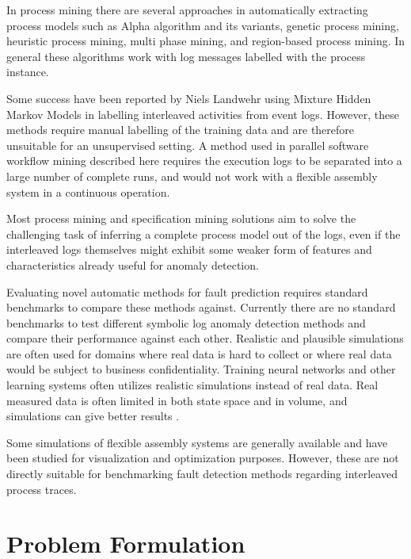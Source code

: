 \documentclass[procedia]{easychair}
\begin{document}
In process mining there are several approaches in automatically extracting process models such as Alpha algorithm and its 
variants, genetic process mining, heuristic process mining, multi phase mining, and region-based process mining. In general these algorithms work with log messages labelled with the process instance.

Some success have been reported by Niels Landwehr using Mixture Hidden Markov Models \cite{landwehr2008modeling} in labelling interleaved activities from event logs.
However, these methods require manual labelling of the training data and are therefore unsuitable for an unsupervised setting.
A method used in parallel software workflow mining described here \cite{mining-program-workflow-from-interleaved-traces} requires the execution logs to be separated into
a large number of complete runs, and would not work with a flexible assembly system in a continuous operation.

Most process mining and specification mining
solutions aim to solve the challenging task of inferring a complete process model out of the logs, even if the interleaved logs themselves might exhibit some weaker form of features
and characteristics already useful for anomaly detection.

Evaluating novel automatic methods for fault prediction requires standard benchmarks to compare these methods against. Currently there are no standard benchmarks to test
different symbolic log anomaly detection methods and compare their performance against each other. Realistic and plausible simulations are often used\cite{jager2014assessing}\cite{FASTTRIPS} for domains where
real data is hard to collect or where real data would be subject to business confidentiality. Training neural networks and other learning systems often utilizes realistic
simulations instead of real data\cite{weston2014memory}. Real measured data is often limited in both state space and in volume,
and simulations can give better results \cite{duch2005artificial}.

Some simulations of flexible assembly systems are generally available\cite{giulio}\cite{el1989simulation}\cite{donath1988flexible} and have been studied for visualization and optimization purposes.
However, these are not directly suitable for benchmarking fault detection methods regarding interleaved process traces.

\section{Problem Formulation}
\end{document}
